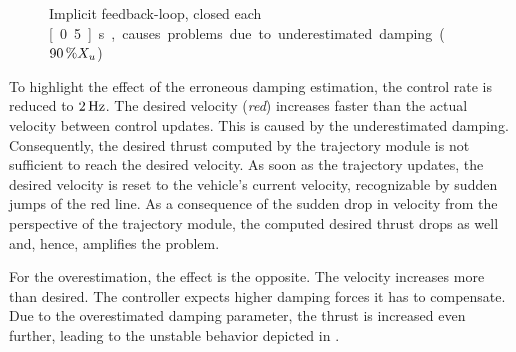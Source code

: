 \begin{figure}
	
	\caption{Implicit feedback-loop, closed each \unit[0.5]{s}, causes problems due to underestimated damping ($\unit[90]{\%} X_u$)}
	\label{fig:implicit_problem_velocity}
\end{figure}
To highlight the effect of the erroneous damping estimation, the control rate is reduced to $\unit[2]{Hz}$. The desired velocity (\emph{red}) increases faster than the actual velocity between control updates.
This is caused by the underestimated damping. Consequently, the desired thrust computed by the trajectory module is not sufficient to reach the desired velocity.
As soon as the trajectory updates, the desired velocity is reset to the vehicle's current velocity, recognizable by sudden jumps of the red line.
As a consequence of the sudden drop in velocity from the perspective of the trajectory module, the computed desired thrust drops as well and, hence, amplifies the problem.

For the overestimation, the effect is the opposite. The velocity increases more than desired.
The controller expects higher damping forces it has to compensate.
Due to the overestimated damping parameter, the thrust is increased even further, leading to the unstable behavior depicted in .

